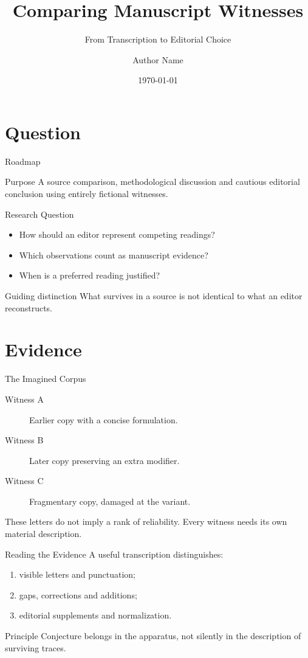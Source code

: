\documentclass{impebeamer}
\title{Comparing Manuscript Witnesses}
\subtitle{From Transcription to Editorial Choice}
\author{Author Name}
\date{\today}
\begin{document}
\begin{frame}
  \titlepage
\end{frame}

\section{Question}
\begin{frame}{Roadmap}
  \tableofcontents
  \medskip
  \begin{block}{Purpose}
    A source comparison, methodological discussion and cautious
    editorial conclusion using entirely fictional witnesses.
  \end{block}
\end{frame}

\begin{frame}{Research Question}
  \begin{itemize}
    \item How should an editor represent competing readings?
    \item Which observations count as manuscript evidence?
    \item When is a preferred reading justified?
  \end{itemize}
  \begin{alertblock}{Guiding distinction}
    What survives in a source is not identical to what
    an editor reconstructs.
  \end{alertblock}
\end{frame}

\section{Evidence}
\begin{frame}{The Imagined Corpus}
  \begin{description}
    \item[Witness A] Earlier copy with a concise formulation.
    \item[Witness B] Later copy preserving an extra modifier.
    \item[Witness C] Fragmentary copy, damaged at the variant.
  \end{description}
  \medskip
  These letters do not imply a rank of reliability.
  Every witness needs its own material description.
\end{frame}

\begin{frame}{Reading the Evidence}
  A useful transcription distinguishes:
  \begin{enumerate}
    \item visible letters and punctuation;
    \item gaps, corrections and additions;
    \item editorial supplements and normalization.
  \end{enumerate}
  \medskip
  \begin{block}{Principle}
    Conjecture belongs in the apparatus, not silently
    in the description of surviving traces.
  \end{block}
\end{frame}
\end{document}

